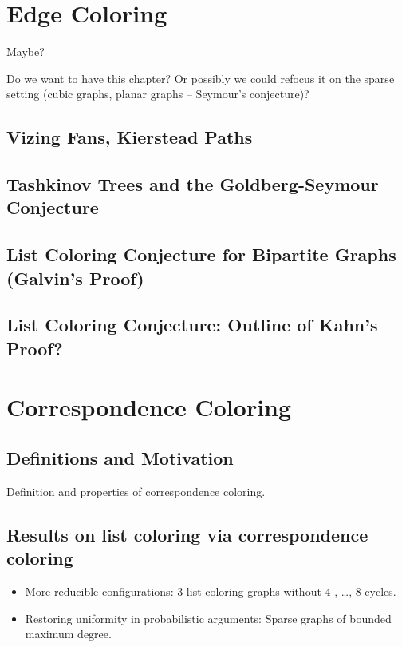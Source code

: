 \documentclass[12pt,twoside,openright,a4paper]{book}
\begin{document}
\chapter{Edge Coloring}\label{chap:edgecol}

Maybe?

Do we want to have this chapter?  Or possibly we could refocus it on the
sparse setting (cubic graphs, planar graphs -- Seymour's conjecture)?

\section{Vizing Fans, Kierstead Paths}
\section{Tashkinov Trees and the Goldberg-Seymour Conjecture}\label{sec:goseycon}
\section{List Coloring Conjecture for Bipartite Graphs (Galvin's Proof)}
\section{List Coloring Conjecture: Outline of Kahn's Proof?}

\chapter{Correspondence Coloring}\label{chap:corresp}


\section{Definitions and Motivation}

Definition and properties of correspondence coloring.

\section{Results on list coloring via correspondence coloring}

\begin{itemize}
\item More reducible configurations: $3$-list-coloring graphs without $4$-, \ldots, $8$-cycles.
\item Restoring uniformity in probabilistic arguments: Sparse graphs of bounded maximum degree.
\end{itemize}
\end{document}
